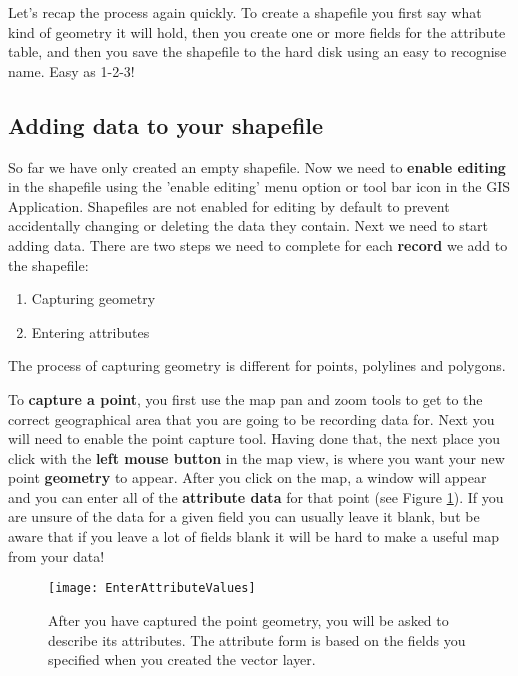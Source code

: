 Let's recap the process again quickly. To create a shapefile you first say
what kind of geometry it will hold, then you create one or more fields for
the attribute table, and then you save the shapefile to the hard disk using
an easy to recognise name. Easy as 1-2-3!

\subsection{Adding data to your shapefile}

So far we have only created an empty shapefile. Now we need to \textbf{enable
editing}
in the shapefile using the 'enable editing' menu option or tool bar icon in
the GIS Application. Shapefiles are not enabled for editing by default to
prevent accidentally changing or deleting the data they contain. Next we need
to start adding data. There are two steps we need to complete for each
\textbf{record} we add to the shapefile:

\begin{enumerate}
\item Capturing geometry
\item Entering attributes 
\end{enumerate}

The process of capturing geometry is different for points, polylines and
polygons. 

To \textbf{capture a point}, you first use the map pan and zoom tools to get to the
correct geographical area that you are going to be recording data for. Next
you will need to enable the point capture tool. Having done that, the next
place you click with the \textbf{left mouse button} in the map view, is where you want
your new point \textbf{geometry} to appear. After you click on the map, a window will
appear and you can enter all of the \textbf{attribute data} for that point (see
Figure \ref{fig:enterattr}). If you are unsure of the data for a given field you
can usually leave it blank, but be aware that if you leave a lot of fields
blank it will be hard to make a useful map from your data!

\begin{figure}[ht]
   \begin{center}
   \caption{After you have captured the point geometry, you will be asked to
describe its attributes. The attribute form is based on the fields you
specified when you created the vector layer.}
\label{fig:enterattr}\smallskip
   \texttt{[image: EnterAttributeValues]}
\end{center}
\end{figure}

